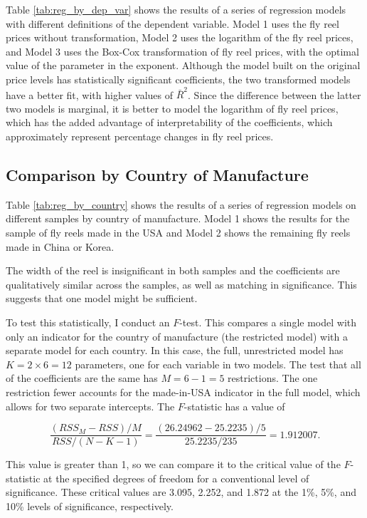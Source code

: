 Table \ref{tab:reg_by_dep_var} shows the results of 
a series of regression models with different definitions of the dependent variable.
Model 1 uses the fly reel prices without transformation, 
Model 2 uses the logarithm of the fly reel prices, 
and Model 3 uses the Box-Cox transformation of fly reel prices, 
with the optimal value of the parameter in the exponent.
% 
Although the model built on the original price levels
has statistically significant coefficients, 
the two transformed models have a better fit, 
with higher values of $\bar{R}^2$. 
Since the difference between the latter two models is marginal, 
it is better to model the logarithm of fly reel prices, 
which has the added advantage of interpretability 
of the coefficients, 
which approximately represent percentage changes in fly reel prices. 



\pagebreak
\subsection{Comparison by Country of Manufacture}

Table \ref{tab:reg_by_country} shows the results of 
a series of regression models 
on different samples by country of manufacture.
Model 1 shows the results for the sample of fly reels made in the USA
and Model 2 shows the remaining fly reels made in China or Korea.



The width of the reel is insignificant in both samples
and the coefficients are qualitatively similar across the samples, as well as matching in significance. 
This suggests that one model might be sufficient. 

To test this statistically, I conduct an $F$-test. 
This compares a single model with only an
indicator for the country of manufacture
(the restricted model)
with a separate model for each country.
In this case, the full, unrestricted model has 
$K = 2\times6 = 12$ parameters, one for each variable in two models. 
The test that all of the coefficients are the same has 
$M = 6 - 1 = 5$
restrictions. 
The one restriction fewer accounts for the made-in-USA indicator
in the full model, 
which allows for two separate intercepts. 
% 
The $F$-statistic has a value of 

$$ 
\frac{(RSS_M - RSS)/M}{RSS/(N - K - 1)} = \frac{(26.24962 - 25.2235)/5}{25.2235/235} = 1.912007. 
$$

This value is greater than 1, so we can compare it to the critical value
of the $F$-statistic at the specified degrees of freedom for
a conventional level of significance.
These critical values are 
3.095, 2.252, and 1.872
at the 1\%, 5\%, and 10\%
levels of significance, respectively.

